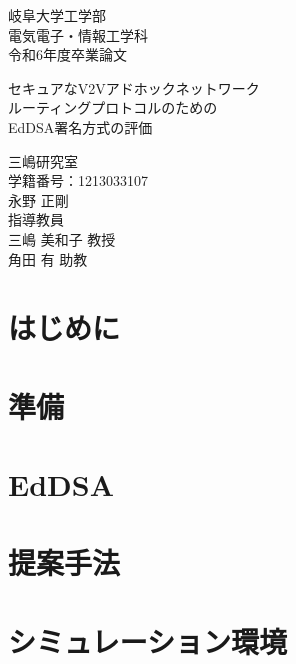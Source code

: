 \documentclass[
  luatex,
  paper=a4paper,
  fontsize=11pt,
  report,
  jlreq_notes,
]{jlreq}
\begin{document}
\begin{titlepage}
  \centering

  {\Large
    岐阜大学工学部 \\ [0.5em]
    電気電子・情報工学科 \\ [0.5em]
    令和6年度卒業論文 \\
  } 
  \vspace{8em} 

  {\huge
    セキュアなV2Vアドホックネットワーク \\
    ルーティングプロトコルのための \\
    EdDSA署名方式の評価 \\
  }
  \vspace{10em}

  \LARGE 三嶋研究室 \\ [0.5em]
  \Large 学籍番号：1213033107 \\ 
  \huge 永野 正剛 \\ [0.5em]
  \Large 指導教員 \\
  {\LARGE 三嶋 美和子 教授} \\
  \LARGE 角田 有 助教 \\

  \vfill 
\end{titlepage}

\tableofcontents

\clearpage

\chapter*{はじめに}

\chapter[　　 準備]{準備}

\chapter[　　 EdDSA]{EdDSA}

\chapter[　　 提案手法]{提案手法}

\chapter[　　 シミュレーション環境]{シミュレーション環境}

\end{document}
